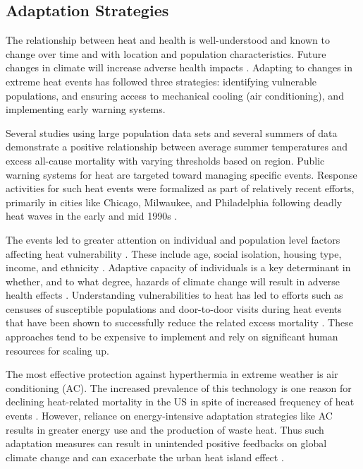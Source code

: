\documentclass{ametsoc}
\begin{document}
\subsection{Adaptation Strategies} \label{subsec:adaptationStrategies}
The relationship between heat and health is well-understood and known to change over time and with location and population characteristics.  Future changes in climate will increase adverse health impacts \citep{Patz2005, Luber2008}. Adapting to changes in extreme heat events has followed three strategies: identifying vulnerable populations, and ensuring access to mechanical cooling (air conditioning), and implementing early warning systems. 

Several studies using large population data sets and several summers of data demonstrate a positive relationship between average summer temperatures and excess all-cause mortality \citep{Medina2007, Basu2002, Curriero2002} with varying thresholds based on region. Public warning systems for heat are targeted toward managing specific events. Response activities for such heat events were formalized as part of relatively recent efforts, primarily in cities like Chicago, Milwaukee, and Philadelphia following deadly heat waves in the early and mid 1990s \citep{Ebi2004,Weisskopf2002}. 

The events led to greater attention on individual and population level factors affecting heat vulnerability \citep{Palecki2001}. These include age, social isolation, housing type, income, and ethnicity \citep{Browning2006,Naughton2002}. Adaptive capacity of individuals is a key determinant in whether, and to what degree, hazards of climate change will result in adverse health effects \citep{Wilhelmi2010}. Understanding vulnerabilities to heat has led to efforts such as censuses of susceptible populations and door-to-door visits during heat events that have been shown to successfully reduce the related excess mortality \citep{Li2012, Weisskopf2002}. These approaches tend to be expensive to implement and rely on significant human resources for scaling up. 

The most effective protection against hyperthermia in extreme weather is air conditioning (AC). The increased prevalence of this technology is one reason for declining heat-related mortality in the US in spite of increased frequency of heat events \citep{Davis2003}. However, reliance on energy-intensive adaptation strategies like AC results in greater energy use and the production of waste heat. Thus such adaptation measures can result in unintended positive feedbacks on global climate change and can exacerbate the urban heat island effect \citep{Salamanca2014}. 
\end{document}
